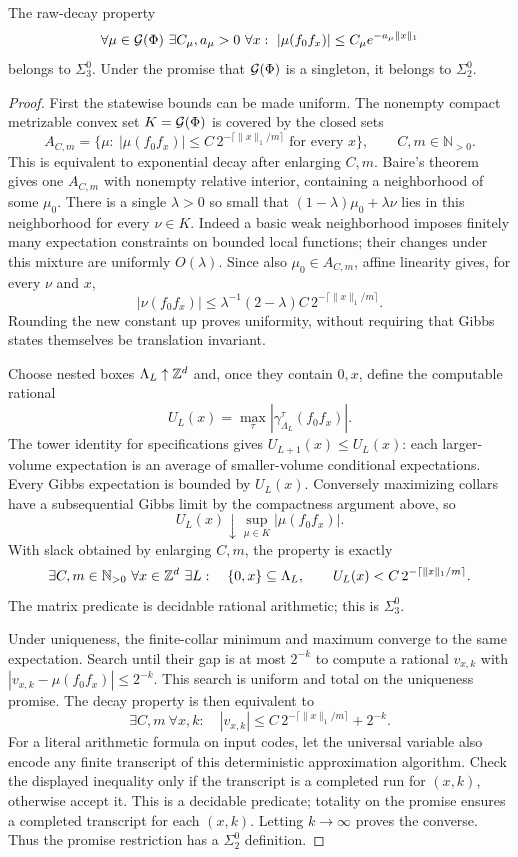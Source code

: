 \begin{proposition}\label{prop:arith}
The raw-decay property
\[
 \forall\mu\in\mathcal G(\Phi)\ \exists C_\mu,a_\mu>0\
 \forall x:\ |\mu(f_0f_x)|\le C_\mu e^{-a_\mu\|x\|_1}
\]
belongs to $\Sigma^0_3$. Under the promise that $\mathcal G(\Phi)$ is a singleton, it belongs to $\Sigma^0_2$.
\end{proposition}
\begin{proof}
First the statewise bounds can be made uniform. The nonempty compact metrizable convex set $K=\mathcal G(\Phi)$ is covered by the closed sets
\[
 A_{C,m}=\{\mu:\ |\mu(f_0f_x)|\le C\,2^{-\lceil\|x\|_1/m\rceil}
                     \text{ for every }x\},\qquad C,m\in\mathbb N_{>0}.
\]
This is equivalent to exponential decay after enlarging $C,m$. Baire's theorem gives one $A_{C,m}$ with nonempty relative interior, containing a neighborhood of some $\mu_0$. There is a single $\lambda>0$ so small that
$(1-\lambda)\mu_0+\lambda\nu$ lies in this neighborhood for every $\nu\in K$. Indeed a basic weak neighborhood imposes finitely many expectation constraints on bounded local functions; their changes under this mixture are uniformly $O(\lambda)$. Since also $\mu_0\in A_{C,m}$, affine linearity gives, for every $\nu$ and $x$,
\[
 |\nu(f_0f_x)|\le\lambda^{-1}(2-\lambda)C\,
                      2^{-\lceil\|x\|_1/m\rceil}.
\]
Rounding the new constant up proves uniformity, without requiring that Gibbs states themselves be translation invariant.

Choose nested boxes $\Lambda_L\uparrow\mathbb Z^d$ and, once they contain $0,x$, define the computable rational
\[
 U_L(x)=\max_\tau|\gamma_{\Lambda_L}^\tau(f_0f_x)|.
\]
The tower identity for specifications gives $U_{L+1}(x)\le U_L(x)$: each larger-volume expectation is an average of smaller-volume conditional expectations. Every Gibbs expectation is bounded by $U_L(x)$. Conversely maximizing collars have a subsequential Gibbs limit by the compactness argument above, so
\[
 U_L(x)\downarrow\sup_{\mu\in K}|\mu(f_0f_x)|.
\]
With slack obtained by enlarging $C,m$, the property is exactly
\[
 \exists C,m\in\mathbb N_{>0}\ \forall x\in\mathbb Z^d\ \exists L:
 \quad \{0,x\}\subseteq\Lambda_L,\qquad
 U_L(x)<C\,2^{-\lceil\|x\|_1/m\rceil}.
\]
The matrix predicate is decidable rational arithmetic; this is $\Sigma^0_3$.

Under uniqueness, the finite-collar minimum and maximum converge to the same expectation. Search until their gap is at most $2^{-k}$ to compute a rational $v_{x,k}$ with
$|v_{x,k}-\mu(f_0f_x)|\le2^{-k}$. This search is uniform and total on the uniqueness promise. The decay property is then equivalent to
\[
 \exists C,m\ \forall x,k:\quad
 |v_{x,k}|\le C\,2^{-\lceil\|x\|_1/m\rceil}+2^{-k}.
\]
For a literal arithmetic formula on input codes, let the universal variable also encode any finite transcript of this deterministic approximation algorithm. Check the displayed inequality only if the transcript is a completed run for $(x,k)$, otherwise accept it. This is a decidable predicate; totality on the promise ensures a completed transcript for each $(x,k)$. Letting $k\to\infty$ proves the converse. Thus the promise restriction has a $\Sigma^0_2$ definition.
\end{proof}

